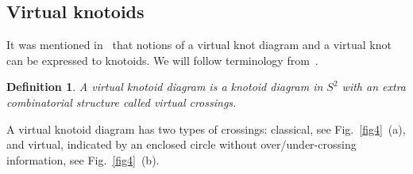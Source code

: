 \documentclass[11pt]{amsart}
\theoremstyle{noparens}
\newtheorem{definition}{Definition}[section]
\numberwithin{equation}{section}
\numberwithin{equation}{section}
\begin{document}
\subsection{Virtual knotoids}

It was mentioned in~\cite{Tur1} that notions of a virtual knot diagram and a virtual knot can be expressed to knotoids. We will follow terminology from~\cite{GK}.

\begin{definition} {\rm 	
A \textit{virtual knotoid diagram} is a knotoid diagram in $S^2$ with an extra combinatorial structure called  \textit{virtual crossings}. 
}
\end{definition}

A virtual knotoid diagram has two types of crossings: classical, see Fig.~\ref{fig4}~(a), and virtual, indicated by an enclosed circle without over/under-crossing information, see Fig.~\ref{fig4}~(b). 
\end{document}
